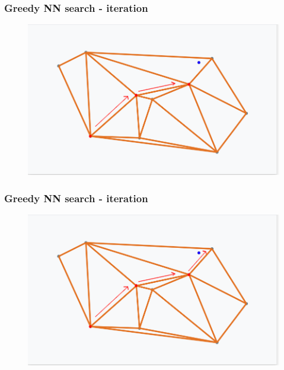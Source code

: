 \documentclass{beamer}
\begin{document}
  \begin{frame}
    \frametitle{Greedy NN search - iteration}  
  \begin{figure}[greedy_search_start_new_step_2_2]
    \vspace*{-0.1cm}
  	\includegraphics[scale=0.3]{greedy_search_start_new_step_2_2} 	
  \end{figure} 
  \end{frame}         

  \begin{frame}
    \frametitle{Greedy NN search - iteration}  
  \begin{figure}[greedy_search_start_new_step_3_1]
    \vspace*{-0.1cm}
  	\includegraphics[scale=0.3]{greedy_search_start_new_step_3_1} 	
  \end{figure} 
  \end{frame}         
\end{document}
